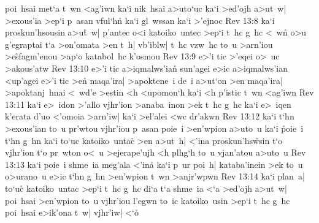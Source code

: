 poi~hsai
met`a
t~wn
<ag'iwn
ka`i
nik~hsai
a>uto`uc
ka`i
>ed'ojh
a>ut~w|
>exous'ia
>ep`i
p~asan
vful`h\r{n}
ka`i
gl~wssan
ka`i
>'ejnoc\bibvsend
\vs Rev 13:8
ka`i
proskun'hsousin
a>u\r{t}~w|
p'antec
o<i
katoiko~untec
>ep`i
t~hc
g~hc
<~wn\r{}
o>u
g'egraptai
t`a
>on'omata
>en
t~h|
vb'iblw|
t~hc
vzw~hc
to~u
>arn'iou
>e\r{s}fagm'enou
>ap`o
katabol~hc
k'osmou\bibvsend
\vs Rev 13:9
e>'i
tic
>'eqei
o>~uc
>akous'atw\bibvsend
\vs Rev 13:10
e>'i
tic
a>iqmalws'ian\r{}
sun'agei
e>ic
a>iqmalws'ian
<up'agei
e>'i
tic
>en\r{}
maqa'ira|
>apoktene~i
de~i
a>ut`on
>en
maqa'ira|
>apoktanj~hnai
<~wd'e
>estin
<h
<upomon`h
ka`i
<h
p'istic
t~wn
<ag'iwn\bibvsend
\vs Rev 13:11
ka`i
e>~idon
>'allo
vjhr'ion
>anaba~inon
>ek
t~hc
g~hc
ka`i
e>~iqen
k'erata
d'uo
<'omoia
>arn'iw|
ka`i
>el'alei
<wc
dr'akwn\bibvsend
\vs Rev 13:12
ka`i
t`hn
>exous'ian
to~u
pr'wtou
vjhr'iou
p~asan
poie~i
>en'wpion
a>uto~u
ka`i
\r{p}oie~i
t`hn
g~hn
ka`i
to`uc
katoiko~untac\r{}
>en
a>ut~h|
<'ina
proskun'hs\r{w}sin
t`o
vjhr'ion
t`o
pr~wton
o<~u
>ejerape'ujh
<h
plhg`h
to~u
vjan'atou
a>uto~u\bibvsend
\vs Rev 13:13
ka`i
poie~i
shme~ia
meg'ala
<'ina\r{}
ka`i
p~ur
poi~h|
kataba'inein
>ek
to~u
o>urano~u
e>ic
t`hn
g~hn
>en'wpion
t~wn
>anjr'wpwn\bibvsend
\vs Rev 13:14
ka`i
plan~a|
to`uc\r{}
katoiko~untac
>ep`i
t~hc
g~hc
di`a
t`a
shme~ia
<`a
>ed'ojh
a>ut~w|
poi~hsai
>en'wpion
to~u
vjhr'iou
l'egwn
to~ic
katoiko~usin
>ep`i
t~hc
g~hc
poi~hsai
e>ik'ona
t~w|
vjhr'iw|
<`o\r{}
